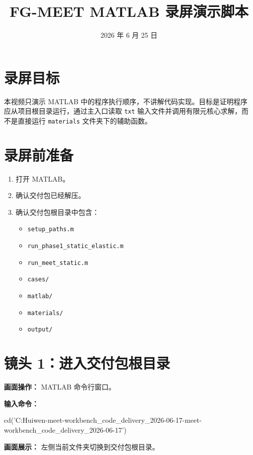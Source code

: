 \documentclass[UTF8,fontset=windows]{ctexart}
\title{FG-MEET MATLAB 录屏演示脚本}
\author{}
\date{2026 年 6 月 25 日}
\begin{document}
\maketitle

\section{录屏目标}

本视频只演示 MATLAB 中的程序执行顺序，不讲解代码实现。目标是证明程序应从项目根目录运行，通过主入口读取 \texttt{txt} 输入文件并调用有限元核心求解，而不是直接运行 \texttt{materials} 文件夹下的辅助函数。

\section{录屏前准备}

\begin{enumerate}
  \item 打开 MATLAB。
  \item 确认交付包已经解压。
  \item 确认交付包根目录中包含：
  \begin{itemize}
    \item \texttt{setup\_paths.m}
    \item \texttt{run\_phase1\_static\_elastic.m}
    \item \texttt{run\_meet\_static.m}
    \item \texttt{cases/}
    \item \texttt{matlab/}
    \item \texttt{materials/}
    \item \texttt{output/}
  \end{itemize}
\end{enumerate}

\section{镜头 1：进入交付包根目录}

\textbf{画面操作：} MATLAB 命令行窗口。

\textbf{输入命令：}

\begin{code}
cd('C:\Users\You Huiwen\Desktop\fg-meet-workbench_code_delivery_2026-06-17\fg-meet-workbench_code_delivery_2026-06-17')
\end{code}

\textbf{画面展示：} 左侧当前文件夹切换到交付包根目录。
\end{document}
